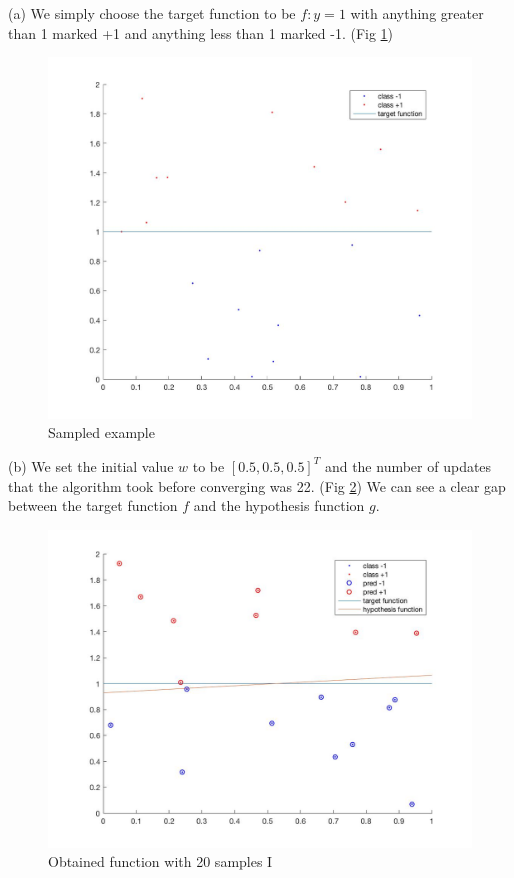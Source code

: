\documentclass[12pt]{article}
\begin{document}
\newpage
{} \\\\
\indent (a) We simply choose the target function to be $f: y=1$ with anything greater than 1 marked +1 and anything less than 1 marked -1. (Fig \ref{fig:Pic2})
\begin{figure}[H]
  \centering
  \includegraphics[scale = 0.25]{Pic2.jpg}
  \caption{Sampled example}
  \label{fig:Pic2}
\end{figure}
\indent (b) We set the initial value $w$ to be $[0.5,0.5,0.5]^T$ and the number of updates that the algorithm took before converging was 22. (Fig \ref{fig:Pic3}) We can see a clear gap between the target function $f$ and the hypothesis function $g$.
\begin{figure}[H]
  \centering
  \includegraphics[scale = 0.25]{Pic3.jpg}
  \caption{Obtained function with 20 samples I}
  \label{fig:Pic3}
\end{figure}
\end{document}
